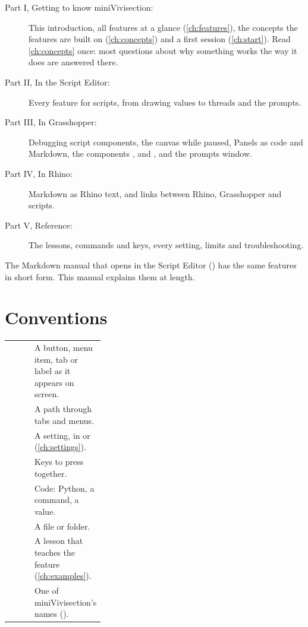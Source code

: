 \begin{description}
  \item[Part I, Getting to know miniVivisection:] This introduction, all features at a glance
    (\cref{ch:features}), the concepts the features are built on (\cref{ch:concepts}) and a first session
    (\cref{ch:start}). Read \cref{ch:concepts} once: most questions about why something works the way it
    does are answered there.
  \item[Part II, In the Script Editor:] Every feature for scripts, from drawing values to threads and the
    prompts.
  \item[Part III, In Grasshopper:] Debugging script components, the canvas while paused, Panels as code
    and Markdown, the components ,  and , and the prompts window.
  \item[Part IV, In Rhino:] Markdown as Rhino text, and links between Rhino, Grasshopper and scripts.
  \item[Part V, Reference:] The lessons, commands and keys, every setting, limits and troubleshooting.
\end{description}

The Markdown manual that  opens in the Script Editor () has the
same features in short form. This manual explains them at length.

\section{Conventions}

\begin{xltabular}{\linewidth}{@{}P{0.32\linewidth}L@{}}
\toprule
{}            & A button, menu item, tab or label as it appears on screen. \\
  & A path through tabs and menus. \\
  & A setting, in  or  (\cref{ch:settings}). \\
             & Keys to press together. \\
       & Code: Python, a command, a value. \\
               & A file or folder. \\
 & A lesson that teaches the feature (\cref{ch:examples}). \\
                    & One of miniVivisection's names (). \\
\bottomrule
\end{xltabular}
